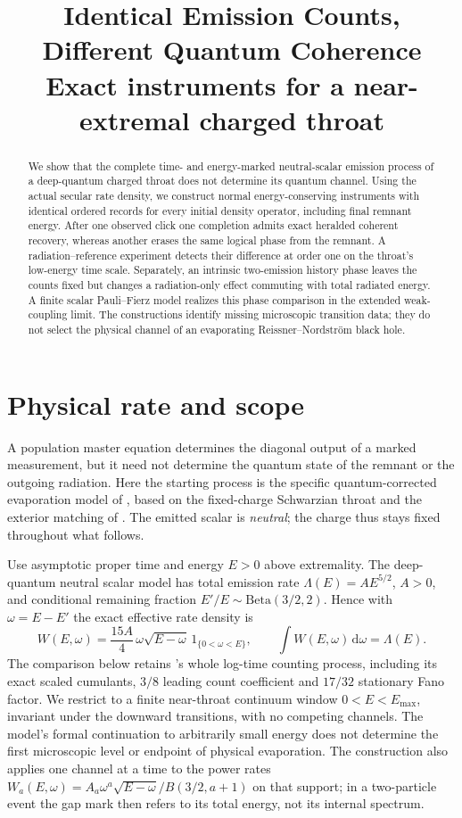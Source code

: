 \documentclass[11pt]{article}
\title{Identical Emission Counts, Different Quantum Coherence\\
\large Exact instruments for a near-extremal charged throat}
\author{}
\date{}
\newcommand{\dd}{\mathrm d}
\begin{document}
\maketitle
\begin{abstract}
We show that the complete time- and energy-marked neutral-scalar emission process of a deep-quantum charged throat does not determine its quantum channel. Using the actual secular rate density, we construct normal energy-conserving instruments with identical ordered records for every initial density operator, including final remnant energy. After one observed click one completion admits exact heralded coherent recovery, whereas another erases the same logical phase from the remnant. A radiation--reference experiment detects their difference at order one on the throat's low-energy time scale. Separately, an intrinsic two-emission history phase leaves the counts fixed but changes a radiation-only effect commuting with total radiated energy. A finite scalar Pauli--Fierz model realizes this phase comparison in the extended weak-coupling limit. The constructions identify missing microscopic transition data; they do not select the physical channel of an evaporating Reissner--Nordstr\"om black hole.
\end{abstract}

\section{Physical rate and scope}
A population master equation determines the diagonal output of a marked measurement, but it need not determine the quantum state of the remnant or the outgoing radiation. Here the starting process is the specific quantum-corrected evaporation model of \cite{biggs,paper36}, based on the fixed-charge Schwarzian throat and the exterior matching of \cite{brown,bai,it}. The emitted scalar is \emph{neutral}; the charge thus stays fixed throughout what follows.

Use asymptotic proper time and energy \(E>0\) above extremality. The deep-quantum neutral scalar model has total emission rate \(\Lambda(E)=AE^{5/2}\), \(A>0\), and conditional remaining fraction \(E'/E\sim\mathrm{Beta}(3/2,2)\). Hence with \(\omega=E-E'\) the exact effective rate density is
\begin{equation}
 W(E,\omega)=\frac{15 A}{4}\,\omega\sqrt{E-\omega}\,1_{\{0<\omega<E\}},
 \qquad \int W(E,\omega)\,\dd\omega=\Lambda(E).                   \label{eq:kernel}
\end{equation}
The comparison below retains \cite{paper36}'s whole log-time counting process, including its exact scaled cumulants, \(3/8\) leading count coefficient and \(17/32\) stationary Fano factor. We restrict to a finite near-throat continuum window \(0<E<E_{\max}\), invariant under the downward transitions, with no competing channels. The model's formal continuation to arbitrarily small energy does not determine the first microscopic level or endpoint of physical evaporation. The construction also applies one channel at a time to the power rates \(W_a(E,\omega)=A_a\omega^a\sqrt{E-\omega}/B(3/2,a+1)\) on that support; in a two-particle event the gap mark then refers to its total energy, not its internal spectrum.
\end{document}
